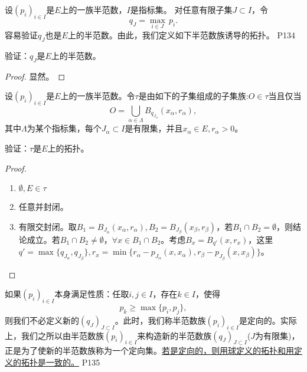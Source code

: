 设$(p_{i})_{i\in I} $是$E$上的一族半范数，$I$是指标集。
\original
{
	对任意有限子集$J\subset I $，令
	\begin{equation*}
		q_{J}=\max_{i\in J}\,p_{i}.
	\end{equation*}
	容易验证$q_{J}$也是$E$上的半范数。由此，我们定义如下半范数族诱导的拓扑。
}
{P134}

\begin{proposition}
	验证：$q_{J}$是$E$上的半范数。
\end{proposition}

\begin{proof}
	显然。
\end{proof}

\begin{definition}
	设$(p_{i})_{i\in I} $是$E$上的一族半范数。令$\tau$是由如下的子集组成的子集族:$O\in \tau $当且仅当
	\begin{equation*}
		O=\bigcup_{\alpha\in \Lambda}B_{q_{J_{\alpha}}}(x_{\alpha},r_{\alpha}),
	\end{equation*}
	其中$\Lambda $为某个指标集，每个$J_{\alpha} \subset I $是有限集，并且$x_{\alpha} \in E ,r_{\alpha}>0$。
\end{definition}

\begin{proposition}
	验证：$\tau$是$E$上的拓扑。
\end{proposition}

\begin{proof}
	\begin{enumerate}
		\item $\emptyset, E \in \tau $
		\item 任意并封闭。
		\item 有限交封闭。取$B_{1}=B_{J_{\alpha}}(x_{\alpha},r_{\alpha}), B_{2}=B_{J_{\beta}}(x_{\beta},r_{\beta}) $，若$B_{1}\cap B_{2}=\emptyset $，则结论成立。若$B_{1}\cap B_{2}\neq \emptyset $，$\forall x \in B_{1}\cap B_{2} $。考虑$B_{x}=B_{q'}(x,r_{x})$，这里$q'=\max\{q_{J_{\alpha}},q_{J_{\beta}}\} ,r_{x}=\min\{r_{\alpha}-p_{J_{\alpha}}(x,x_{\alpha}),r_{\beta}-p_{J_{\beta}}(x,x_{\beta}) \}$。
	\end{enumerate}
\end{proof}

\original
{
	如果$(p_{i})_{i\in I } $本身满足性质：任取$i,j\in I $，存在$k\in I $，使得
	\begin{equation*}
		p_{k}\geq \max\{p_{i},p_{j}\},
	\end{equation*}
	则我们不必定义新的$(q_{J})_{J\subset I} $。此时，我们称半范数族$(p_{i})_{i\in I} $是定向的。实际上，我们之所以由半范数族$(p_{i})_{i\in I} $来构造新的半范数族$(q_{J})_{J\subset I} $($J$为有限集)，正是为了使新的半范数族称为一个定向集。\uline{若是定向的，则用球定义的拓扑和用定义的拓扑是一致的。}
}
{P135}

